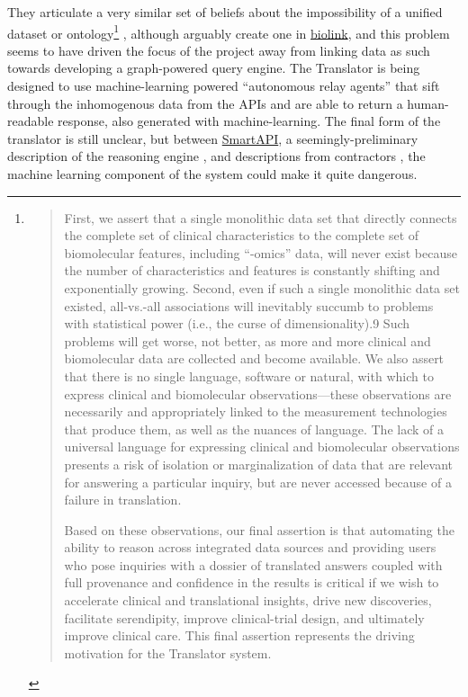 \documentclass[notoc]{tufte-book}
\begin{document}
They articulate a very similar set of beliefs about the impossibility of
a unified dataset or ontology\footnote{\begin{quote}
  First, we assert that a single monolithic data set that directly
  connects the complete set of clinical characteristics to the complete
  set of biomolecular features, including ``-omics'' data, will never
  exist because the number of characteristics and features is constantly
  shifting and exponentially growing. Second, even if such a single
  monolithic data set existed, all-vs.-all associations will inevitably
  succumb to problems with statistical power (i.e., the curse of
  dimensionality).9 Such problems will get worse, not better, as more
  and more clinical and biomolecular data are collected and become
  available. We also assert that there is no single language, software
  or natural, with which to express clinical and biomolecular
  observations---these observations are necessarily and appropriately
  linked to the measurement technologies that produce them, as well as
  the nuances of language. The lack of a universal language for
  expressing clinical and biomolecular observations presents a risk of
  isolation or marginalization of data that are relevant for answering a
  particular inquiry, but are never accessed because of a failure in
  translation.

  Based on these observations, our final assertion is that automating
  the ability to reason across integrated data sources and providing
  users who pose inquiries with a dossier of translated answers coupled
  with full provenance and confidence in the results is critical if we
  wish to accelerate clinical and translational insights, drive new
  discoveries, facilitate serendipity, improve clinical-trial design,
  and ultimately improve clinical care. This final assertion represents
  the driving motivation for the Translator system. \citep{consortiumUniversalBiomedicalData2019} 
  \end{quote}}\citep{consortiumUniversalBiomedicalData2019} ,
although arguably create one in
\href{https://biolink.github.io/biolink-model/docs/}{biolink}, and this
problem seems to have driven the focus of the project away from linking
data as such towards developing a graph-powered query engine. The
Translator is being designed to use machine-learning powered
``autonomous relay agents'' that sift through the inhomogenous data from
the APIs and are able to return a human-readable response, also
generated with machine-learning. The final form of the translator is
still unclear, but between
\href{https://smart-api.info/portal/translator}{SmartAPI}, a
seemingly-preliminary description of the reasoning engine \citep{goelExplanationContainerCaseBased2021} , and descriptions from
contractors \citep{ROBOKOPCoVar2021} , the machine learning
component of the system could make it quite dangerous.
\end{document}
